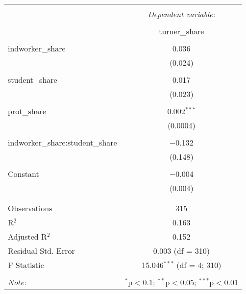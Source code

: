 
\begin{table}[!htbp] \centering 
  \caption{} 
  \label{} 
\begin{tabular}{@{\extracolsep{5pt}}lc} 
\\[-1.8ex]\hline 
\hline \\[-1.8ex] 
 & \multicolumn{1}{c}{\textit{Dependent variable:}} \\ 
\cline{2-2} 
\\[-1.8ex] & turner\_share \\ 
\hline \\[-1.8ex] 
 indworker\_share & 0.036 \\ 
  & (0.024) \\ 
  & \\ 
 student\_share & 0.017 \\ 
  & (0.023) \\ 
  & \\ 
 prot\_share & 0.002$^{***}$ \\ 
  & (0.0004) \\ 
  & \\ 
 indworker\_share:student\_share & $-$0.132 \\ 
  & (0.148) \\ 
  & \\ 
 Constant & $-$0.004 \\ 
  & (0.004) \\ 
  & \\ 
\hline \\[-1.8ex] 
Observations & 315 \\ 
R$^{2}$ & 0.163 \\ 
Adjusted R$^{2}$ & 0.152 \\ 
Residual Std. Error & 0.003 (df = 310) \\ 
F Statistic & 15.046$^{***}$ (df = 4; 310) \\ 
\hline 
\hline \\[-1.8ex] 
\textit{Note:}  & \multicolumn{1}{r}{$^{*}$p$<$0.1; $^{**}$p$<$0.05; $^{***}$p$<$0.01} \\ 
\end{tabular} 
\end{table} 
